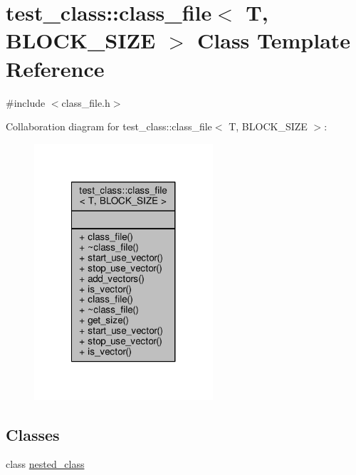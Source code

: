 \hypertarget{classtest__class_1_1class__file}{\section{test\-\_\-class\-:\-:class\-\_\-file$<$ T, B\-L\-O\-C\-K\-\_\-\-S\-I\-Z\-E $>$ Class Template Reference}
\label{classtest__class_1_1class__file}
}


{\ttfamily \#include $<$class\-\_\-file.\-h$>$}



Collaboration diagram for test\-\_\-class\-:\-:class\-\_\-file$<$ T, B\-L\-O\-C\-K\-\_\-\-S\-I\-Z\-E $>$\-:
\nopagebreak
\begin{figure}[H]
\begin{center}
\leavevmode
\includegraphics[width=188pt]{classtest__class_1_1class__file__coll__graph}
\end{center}
\end{figure}
\subsection*{Classes}
\begin{DoxyCompactItemize}
\item 
class \hyperlink{classtest__class_1_1class__file_1_1nested__class}{nested\-\_\-class}
\end{DoxyCompactItemize}
